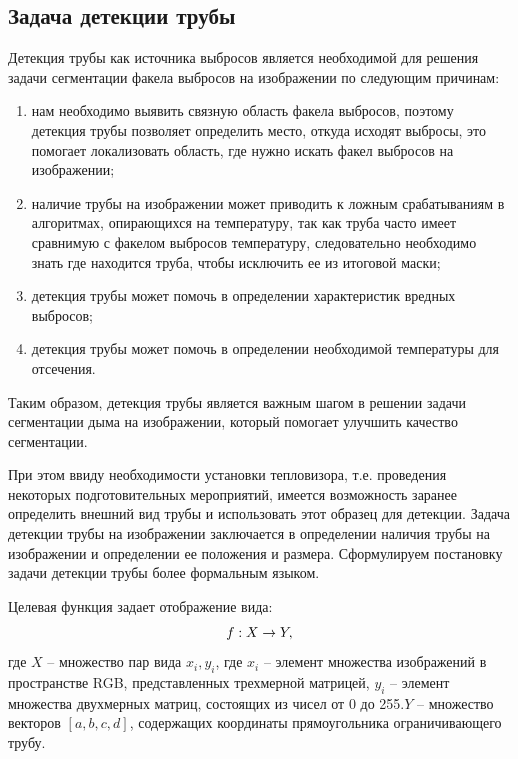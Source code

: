 \documentclass[14pt, a4paper]{extreport}
\begin{document}
\subsection{Задача детекции трубы}
	Детекция трубы как источника выбросов является необходимой для решения задачи сегментации факела выбросов на изображении по следующим причинам:
	\begin{enumerate}[label={\arabic*)}]
		\item нам необходимо выявить связную область факела выбросов, поэтому детекция трубы позволяет определить место, откуда исходят выбросы, это помогает локализовать область, где нужно искать факел выбросов на изображении;
		\item наличие трубы на изображении может приводить к ложным срабатываниям в алгоритмах, опирающихся на температуру, так как труба часто имеет сравнимую с факелом выбросов температуру, следовательно необходимо знать где находится труба, чтобы исключить ее из итоговой маски;
		\item детекция трубы может помочь в определении характеристик вредных выбросов; 
		\item детекция трубы может помочь в определении необходимой температуры для отсечения. 
	\end{enumerate}
	Таким образом, детекция трубы является важным шагом в решении задачи сегментации дыма на изображении, который помогает улучшить качество сегментации.
	
	При этом ввиду необходимости установки тепловизора, т.е. проведения некоторых подготовительных мероприятий, имеется возможность заранее определить внешний вид трубы и использовать этот образец для детекции. Задача детекции трубы на изображении заключается в определении наличия трубы на изображении и определении ее положения и размера. Сформулируем постановку задачи детекции трубы более формальным языком.
	
	Целевая функция задает отображение вида:
	\vspace*{-0.2cm}
	\begin{equation}
		f : X \rightarrow Y,
		\label{f:x->[4]}
		\vspace*{-0.4cm}
	\end{equation}
	где $X$ -- множество пар вида $x_i, y_i$, где $x_i$ -- элемент множества изображений в пространстве RGB, представленных трехмерной матрицей, $y_i$ -- элемент множества двухмерных матриц, состоящих из чисел от 0 до 255.\linebreak $Y$ -- множество векторов $[a, b, c, d]$, содержащих координаты прямоугольника ограничивающего трубу. 
	
\end{document}
